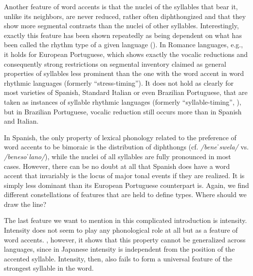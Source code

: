 \documentclass[output=paper]{LSP/langsci}
\begin{document}
Another feature of word accents is that the nuclei of the syllables that bear it, unlike its neighbors, are never reduced, rather often diphthongized and that they show more segmental contrasts than the nuclei of other syllables. Interestingly, exactly this feature has been shown repeatedly as being dependent on what has been called the rhythm type of a given language (\citealt{Dauer1983,Auer1993,Auer2001,Dufter2003}). In Romance languages, e.g., it holds for European Portuguese, which shows exactly the vocalic reductions and consequently strong restrictions on segmental inventory claimed as general properties of syllables less prominent than the one with the word accent in word rhythmic languages (formerly ``stress-timing''). It does not hold as clearly for most varieties of Spanish, Standard Italian or even Brazilian Portuguese, that are taken as instances of syllable rhythmic languages (formerly ``syllable-timing'', \citealt{Abaurre1998,Reich.2002}), but in Brazilian Portuguese, vocalic reduction still occurs more than in Spanish and Italian. 

In Spanish, the only property of lexical phonology related to the preference of word accents to be bimoraic is the distribution of diphthongs (cf. \textit{/beneˈswela/} vs. \textit{/benesoˈlano/}), while the nuclei of all syllables are fully pronounced in most cases. However, there can be no doubt at all that Spanish does have a word accent that invariably is the locus of major tonal events if they are realized. It is simply less dominant than its European Portuguese counterpart is. Again, we find different constellations of features that are held to define types. Where should we draw the line?

The last feature we want to mention in this complicated introduction is intensity. Intensity does not seem to play any phonological role at all but as a feature of word accents. \citet[160]{Beckman1986}, however, it shows that this property cannot be generalized across languages, since in Japanese intensity is independent from the position of the accented syllable. Intensity, then, also fails to form a universal feature of the strongest syllable in the word. 
\end{document}
